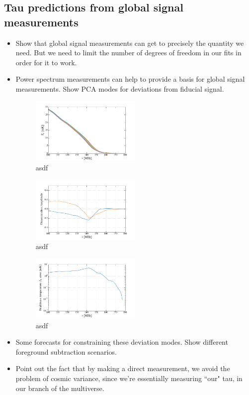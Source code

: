 \documentclass[twocolumn,aps,prd,nofootinbib,showpacs]{revtex4-1}
\begin{document}
\subsection{Tau predictions from global signal measurements}
\begin{itemize}
\item Show that global signal measurements can get to precisely the quantity we need. But we need to limit the number of degrees of freedom in our fits in order for it to work.
\item Power spectrum measurements can help to provide a basis for global signal measurements. Show PCA modes for deviations from fiducial signal.

\begin{figure}[!]
	\centering
	\includegraphics[width=0.5\textwidth]{figures/sampled_Tb_cutoff.png}
	\caption{asdf}
	\label{fig:sampled_Tb_cutoff}
\end{figure}

\begin{figure}[!]
	\centering
	\includegraphics[width=0.5\textwidth]{figures/PCA_cutoff.png}
	\caption{asdf}
	\label{fig:PCA_cutoff}
\end{figure}


\begin{figure}[!]
	\centering
	\includegraphics[width=0.5\textwidth]{figures/Tb_global_errors.png}
	\caption{asdf}
	\label{fig:Tb_global_errors}
\end{figure}

\item Some forecasts for constraining these deviation modes. Show different foreground subtraction scenarios.
\item Point out the fact that by making a direct measurement, we avoid the problem of cosmic variance, since we're essentially measuring ``our" tau, in our branch of the multiverse.
\end{itemize}
\end{document}
